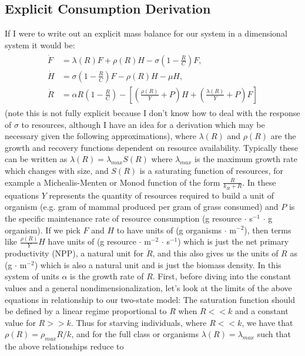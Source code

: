 \documentclass{pnastwo}
\begin{document}
\begin{article}

\section*{Explicit Consumption Derivation}
If I were to write out an explicit mass balance for our system in a dimensional system it would be:
\begin{align} 
\begin{split}
\dot{F} &= \lambda\left(R\right) F + \rho\left(R\right)H - \sigma \left(1-\frac{R}{C}\right)F,  \\
\dot{H} &= \sigma \left(1-\frac{R}{C}\right)F - \rho\left(R\right)H - \mu H,  \\
\dot{R} &= \alpha R\left(1-\frac{R}{C}\right) -\left[\left(\frac{\rho\left(R\right)}{Y}+P\right)H+\left(\frac{\lambda\left(R\right)}{Y}+P\right)F\right]
\end{split}
\end{align}
(note this is not fully explicit because I don't know how to deal with the response of $\sigma$ to resources, although I have an idea for a derivation which may be necessary given the following approximations), where $\lambda\left(R\right)$ and $\rho\left(R\right)$ are the growth and recovery functions dependent on resource availability. Typically these can be written as $\lambda\left(R\right)=\lambda_{max}S\left(R\right)$ where $\lambda_{max}$ is the maximum growth rate which changes with size, and $S\left(R\right)$ is a saturating function of resources, for example a Michealis-Menten or Monod function of the form $\frac{R}{k_{H}+R}$.  In these equations $Y$ represents the quantity of resources required to build a unit of organism (e.g. gram of mammal produced per gram of grass consumed) and $P$ is the specific maintenance rate of resource consumption (g resource $\cdot$ s$^{-1}$ $\cdot$ g organism). If we pick $F$ and $H$ to have units of (g organisms $\cdot$ m$^{-2}$), then terms like $\frac{\rho\left(R\right)}{Y}H$ have units of (g resource $\cdot$ m$^{-2}$ $\cdot$ s$^{-1}$) which is just the net primary productivity (NPP), a natural unit for $\dot{R}$, and this also gives us the units of $R$ as (g $\cdot$ m$^{-2}$) which is also a natural unit and is just the biomass density. In this system of units $\alpha$ is the growth rate of $R$. First, before diving into the constant values and a general nondimensionalization, let's look at the limits of the above equations in relationship to our two-state model: The saturation function should be defined by a linear regime proportional to $R$ when $R<<k$ and a constant value for $R>>k$. Thus for starving individuals, where $R<<k$, we have that $\rho\left(R\right)=\rho_{max}R/k$, and for the full class or organisms $\lambda\left(R\right)=\lambda_{max}$ such that the above relationships reduce to

\end{article}
\end{document}
